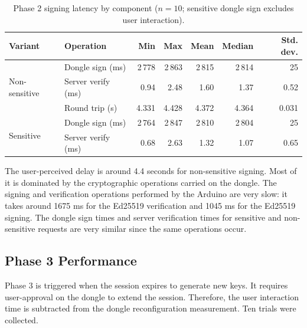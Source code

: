 \begin{table}[ht!]
\centering
\caption{Phase 2 signing latency by component ($n=10$; sensitive dongle sign excludes user interaction).}
\begin{tabular}{llrrrrr}
\hline
\textbf{Variant} & \textbf{Operation} & \textbf{Min} & \textbf{Max} & \textbf{Mean} & \textbf{Median} & \textbf{Std. dev.} \\
\hline
\multirow{3}{*}{Non-sensitive}
  & Dongle sign (ms)   & 2\,778 & 2\,863 & 2\,815 & 2\,814 & 25 \\
  & Server verify (ms) &   0.94 &   2.48 &   1.60 &   1.37 & 0.52 \\
  & Round trip (s)     &  4.331 &  4.428 &  4.372 &  4.364 & 0.031 \\
\hline
\multirow{2}{*}{Sensitive}
  & Dongle sign (ms)   & 2\,764 & 2\,847 & 2\,810 & 2\,804 & 25 \\
  & Server verify (ms) &   0.68 &   2.63 &   1.32 &   1.07 & 0.65 \\
\hline
\end{tabular}
\label{tab:perf-phase2}
\end{table}

The user-perceived delay is around 4.4 seconds for non-sensitive signing. Most of it is dominated by the cryptographic operations carried on the dongle. The signing and verification operations performed by the Arduino are very slow: it takes around 1675 ms for the Ed25519 verification and 1045 ms for the Ed25519 signing. The dongle sign times and server verification times for sensitive and non-sensitive requests are very similar since the same operations occur. 

\subsection{Phase 3 Performance}
Phase 3 is triggered when the session expires to generate new keys. It requires user-approval on the dongle to extend the session. Therefore, the user interaction time is subtracted from the dongle reconfiguration measurement. Ten trials were collected.

